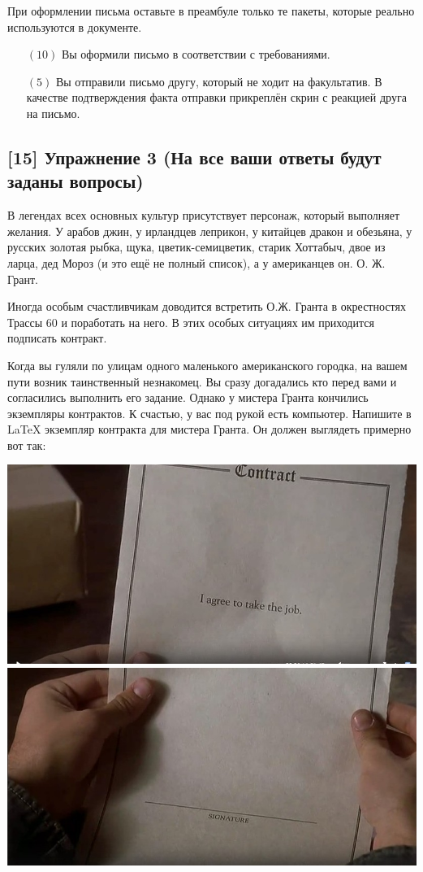 \documentclass[12pt, a4paper, oneside]{article}
\begin{document}
При оформлении письма оставьте в преамбуле только те пакеты, которые реально используются в документе.

\begin{itemize}
\item[$(10)$] Вы оформили письмо в соответствии с требованиями.

\item[$(5)$] Вы отправили письмо другу, который не ходит на факультатив. В качестве подтверждения факта отправки прикреплён скрин с реакцией друга на письмо.
\end{itemize}

\subsection*{[15]  Упражнение 3 (На все ваши ответы будут заданы вопросы)}

В легендах всех основных культур присутствует персонаж, который выполняет желания. У арабов джин, у ирландцев леприкон, у китайцев дракон и обезьяна, у русских золотая рыбка, щука, цветик-семицветик, старик Хоттабыч, двое из ларца, дед Мороз (и это ещё не полный список), а у американцев он. О. Ж. Грант.

Иногда особым счастливчикам доводится встретить О.Ж. Гранта в окрестностях Трассы 60 и поработать на него. В этих особых ситуациях им приходится подписать контракт.

Когда вы гуляли по улицам одного маленького американского городка, на вашем пути возник таинственный незнакомец. Вы сразу догадались кто перед вами и согласились выполнить его задание. Однако у мистера Гранта кончились экземпляры контрактов. К счастью, у вас под рукой есть компьютер. Напишите в \LaTeX{} экземпляр контракта для мистера Гранта. Он должен выглядеть примерно вот так:

\begin{center}
	\includegraphics[scale=0.4]{Hg91uSv1cik.jpg}
	\includegraphics[scale=0.4]{t_XxgIqEmBE.jpg}
\end{center} 
\end{document}
